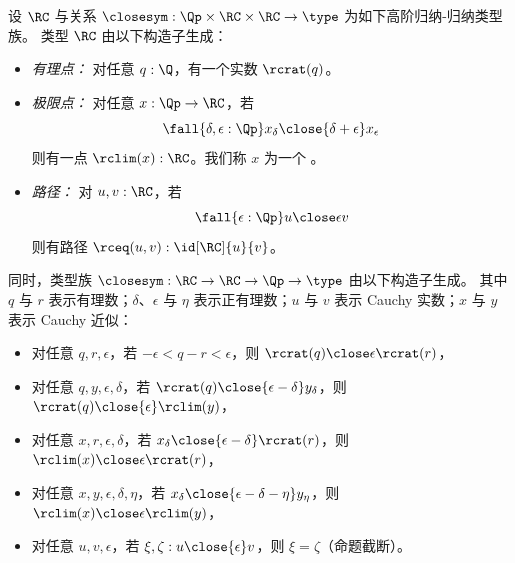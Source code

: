 \begin{defn}\label{defn:cauchy-reals}
  设 $\RC$ 与关系 $\closesym:\Qp \times \RC \times \RC \to \type$ 为如下高阶归纳-归纳类型族。
  类型 $\RC$
  由以下构造子生成：
  \begin{itemize}
  \item \emph{有理点：}
    对任意 $q : \Q$，有一个实数 $\rcrat(q)$。
  \item \emph{极限点：}
    对任意 $x : \Qp \to \RC$，若
    \begin{equation}
      \label{eq:RC-cauchy}
      \fall{\delta, \epsilon : \Qp} x_\delta \close{\delta + \epsilon} x_\epsilon
    \end{equation}
    则有一点 $\rclim(x) : \RC$。我们称 $x$ 为一个 。
  \item \emph{路径：}
    对 $u, v : \RC$，若
    \begin{equation}
      \label{eq:RC-path}
      \fall{\epsilon : \Qp} u \close\epsilon v
    \end{equation}
    则有路径 $\rceq(u, v) : \id[\RC]{u}{v}$。
  \end{itemize}
  同时，类型族 $\closesym:\RC\to\RC\to\Qp \to\type$ 由以下构造子生成。
  其中 $q$ 与 $r$ 表示有理数；$\delta$、$\epsilon$ 与 $\eta$ 表示正有理数；$u$ 与 $v$ 表示 Cauchy 实数；$x$ 与 $y$ 表示 Cauchy 近似：
  \begin{itemize}
  \item 对任意 $q,r,\epsilon$，若 $-\epsilon < q - r < \epsilon$，则 $\rcrat(q) \close\epsilon \rcrat(r)$，
  \item 对任意 $q,y,\epsilon,\delta$，若 $\rcrat(q) \close{\epsilon - \delta} y_\delta$，则 $\rcrat(q) \close{\epsilon} \rclim(y)$，
  \item 对任意 $x,r,\epsilon,\delta$，若 $x_\delta \close{\epsilon - \delta} \rcrat(r)$，则 $\rclim(x) \close\epsilon \rcrat(r)$，
  \item 对任意 $x,y,\epsilon,\delta,\eta$，若 $x_\delta \close{\epsilon - \delta - \eta} y_\eta$，则 $\rclim(x) \close\epsilon \rclim(y)$，
  \item 对任意 $u,v,\epsilon$，若 $\xi,\zeta : u \close{\epsilon} v$，则 $\xi=\zeta$（命题截断）。
  \end{itemize}
\end{defn}

